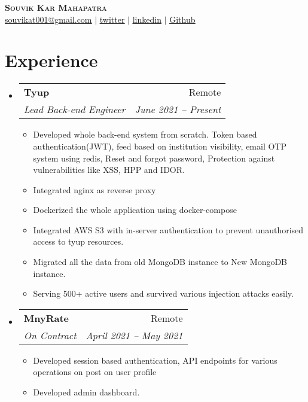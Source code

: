 \documentclass[letterpaper,11pt]{article}
\makeatletter
\newcommand{\resumeItem}[1]{
  \item\small{
    {#1 \vspace{-2pt}}
  }
}
\newcommand{\resumeSubheading}[4]{
  \vspace{-2pt}\item
    \begin{tabular*}{0.97\textwidth}[t]{l@{\extracolsep{\fill}}r}
      \textbf{#1} & #2 \\
      \textit{\small#3} & \textit{\small #4} \\
    \end{tabular*}\vspace{-7pt}
}
\newcommand{\resumeSubSubheading}[2]{
    \item
    \begin{tabular*}{0.97\textwidth}{l@{\extracolsep{\fill}}r}
      \textit{\small#1} & \textit{\small #2} \\
    \end{tabular*}\vspace{-7pt}
}
\newcommand{\resumeSubHeadingListStart}{\begin{itemize}[leftmargin=0.15in, label={}]}
\newcommand{\resumeSubHeadingListEnd}{\end{itemize}}
\newcommand{\resumeItemListStart}{\begin{itemize}}
\newcommand{\resumeItemListEnd}{\end{itemize}\vspace{-5pt}}
\makeatother
\begin{document}

\begin{center}
    \textbf{\Huge \scshape Souvik Kar Mahapatra} \\ \vspace{1pt}
    \href{mailto:souvikat001@gmail.com}{\underline{souvikat001@gmail.com}} $|$ 
    \href{https://twitter.com/souvikinator}{\underline{twitter}} $|$ 
    \href{https://linkedin.com/in/souvik-kar-mahapatra}{\underline{linkedin}} $|$
    \href{https://github.com/souvikinator}{\underline{Github}}
    
\end{center}


\section{Experience}
  \resumeSubHeadingListStart
    \resumeSubheading
      {Tyup}{Remote}
      {Lead Back-end Engineer}{June 2021 -- Present}
      \resumeItemListStart
        \resumeItem{Developed whole back-end system from scratch. Token based authentication(JWT), feed based on institution visibility, email OTP system using redis, Reset and forgot password, Protection against vulnerabilities like XSS, HPP and IDOR.}
        \resumeItem{Integrated nginx as reverse proxy }
        \resumeItem{Dockerized the whole application using docker-compose}
        \resumeItem{Integrated AWS S3 with in-server authentication to prevent unauthorised access to tyup resources.}
        \resumeItem{Migrated all the data from old MongoDB instance to New MongoDB instance.}
        \resumeItem{Serving 500+ active users and survived various injection attacks easily.}
        
    
      \resumeItemListEnd
    \resumeSubheading
      {MnyRate}{Remote}
      {On Contract}{April 2021 -- May 2021}
      \resumeItemListStart
        \resumeItem{Developed session based authentication, API endpoints for various operations on post on user profile}
        \resumeItem{Developed admin dashboard.}
     \resumeItemListEnd
  \resumeSubHeadingListEnd
\end{document}
